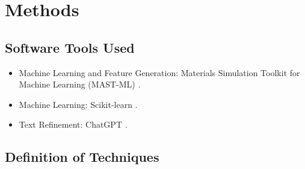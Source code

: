 \section{Methods}

\subsection{Software Tools Used}
\begin{itemize}
    \item Machine Learning and Feature Generation: Materials Simulation Toolkit for Machine Learning (MAST-ML) \cite{Jacobs2020}.
    \item Machine Learning: Scikit-learn \cite{scikit-learn}.
    \item Text Refinement: ChatGPT \cite{gpt-3.5}.
\end{itemize}

\subsection{Definition of Techniques}

